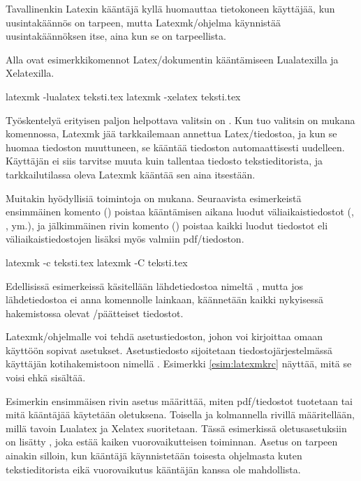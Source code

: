 Tavallinenkin Latexin kääntäjä kyllä huomauttaa tietokoneen käyttäjää,
kun uusintakäännös on tarpeen, mutta Latexmk\-/ohjelma käynnistää
uusintakäännöksen itse, aina kun se on tarpeellista.

Alla ovat esimerkkikomennot Latex\-/dokumentin kääntämiseen Lualatexilla
ja Xelatexilla.

\begin{koodilohkosis}
  latexmk -lualatex teksti.tex
  latexmk -xelatex  teksti.tex
\end{koodilohkosis}

Työskentelyä erityisen paljon helpottava valitsin on . Kun
tuo valitsin on mukana komennossa, Latexmk jää tarkkailemaan annettua
Latex\-/tiedostoa, ja kun se huomaa tiedoston muuttuneen, se kääntää
tiedoston automaattisesti uudelleen. Käyttäjän ei siis tarvitse muuta
kuin tallentaa tiedosto tekstieditorista, ja tarkkailutilassa oleva
Latexmk kääntää sen aina itsestään.

Muitakin hyödyllisiä toimintoja on mukana. Seuraavista esimerkeistä
ensimmäinen komento () poistaa kääntämisen aikana
luodut väliaikaistiedostot (, ,  ym.),
ja jälkimmäinen rivin komento () poistaa kaikki
luodut tiedostot eli väliaikaistiedostojen lisäksi myös valmiin
pdf\-/tiedoston.

\begin{koodilohkosis}
  latexmk -c teksti.tex
  latexmk -C teksti.tex
\end{koodilohkosis}

Edellisissä esimerkeissä käsitellään lähdetiedostoa nimeltä
, mutta jos lähdetiedostoa ei anna komennolle
lainkaan, käännetään kaikki nykyisessä hakemistossa olevat
\-/päätteiset tiedostot.

Latexmk\-/ohjelmalle voi tehdä asetustiedoston, johon voi kirjoittaa
omaan käyttöön sopivat asetukset. Asetustiedosto sijoitetaan
tiedostojärjestelmässä käyttäjän kotihakemistoon nimellä
. Esimerkki \ref{esim:latexmkrc} näyttää, mitä se
voisi ehkä sisältää.

Esimerkin ensimmäisen rivin asetus määrittää, miten pdf\-/tiedostot
tuotetaan tai mitä kääntäjää käytetään oletuksena. Toisella ja
kolmannella rivillä määritellään, millä tavoin Lualatex ja Xelatex
suoritetaan. Tässä esimerkissä ole\-tus\-ase\-tuk\-siin on lisätty
, joka estää kaiken vuorovaikutteisen toiminnan.
Asetus on tarpeen ainakin silloin, kun kääntäjä käynnistetään toisesta
ohjelmasta kuten tekstieditorista eikä vuorovaikutus kääntäjän kanssa
ole mahdollista.

